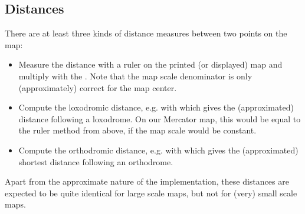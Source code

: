   \begin{dispExample}
    \hfill{}
    \begin{center}\fontsize{7pt}{7pt}\sffamily\mrcmapattribution\end{center}
  \end{dispExample}


\clearpage
\subsection{Distances}

There are at least three kinds of distance measures between two points
on the map:
\begin{itemize}
\item Measure the distance with a ruler on the printed (or displayed) map
  and multiply with the .
  Note that the map scale denominator is only (approximately) correct
  for the map center.
\item Compute the loxodromic distance, e.g. with 
  which gives the (approximated) distance following a loxodrome.
  On our Mercator map, this would be equal to the ruler method from above,
  if the map scale would be constant.
\item Compute the orthodromic distance, e.g. with 
  which gives the (approximated) shortest distance following an orthodrome.
\end{itemize}
Apart from the approximate nature of the implementation, these distances
are expected to be quite identical for large scale maps, but not for
(very) small scale maps.

